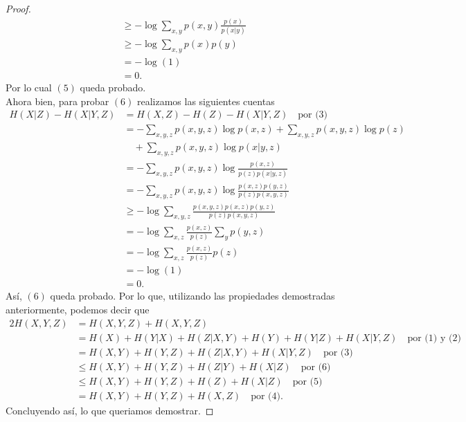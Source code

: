 \begin{enumerate}
\begin{proof}
\begin{align*}
&\geq -\log \sum_{x,y} p(x,y) \frac{p(x)}{p(x|y)} \\
&\geq -\log \sum_{x,y} p(x)p(y) \\
&= -\log(1)\\
&= 0.
\end{align*}
Por lo cual $(5)$ queda probado.\\
Ahora bien, para probar $(6)$ realizamos las siguientes cuentas 
\begin{align*}
H(X|Z) - H(X|Y,Z) 
&= H(X,Z) - H(Z) - H(X|Y,Z) \quad \text{por (3)} \\
&= -\sum_{x,y,z} p(x,y,z) \log p(x,z) + \sum_{x,y,z} p(x,y,z) \log p(z) \\
&\quad + \sum_{x,y,z} p(x,y,z) \log p(x|y,z) \\
&= -\sum_{x,y,z} p(x,y,z) \log \frac{p(x,z)}{p(z)p(x|y,z)} \\
&= -\sum_{x,y,z} p(x,y,z) \log \frac{p(x,z)p(y,z)}{p(z)p(x,y,z)} \\
&\geq -\log \sum_{x,y,z} \frac{p(x,y,z) p(x,z)p(y,z)}{p(z)p(x,y,z)} \\
&= -\log \sum_{x,z} \frac{p(x,z)}{p(z)} \sum_{y} p(y,z) \\
&= -\log \sum_{x,z} \frac{p(x,z)}{p(z)} p(z) \\
&= -\log(1)\\ 
&= 0
.\end{align*}
Así, $(6)$ queda probado. Por lo que, utilizando las propiedades demostradas anteriormente, podemos decir que 
\begin{align*}
    2H(X,Y,Z)&=H(X,Y,Z)+H(X,Y,Z)\\
    &=H(X)+H(Y|X)+H(Z|X,Y)+H(Y)+H(Y|Z)+H(X|Y,Z) \quad \text{por (1) y (2)}\\
    &=H(X,Y)+H(Y,Z)+H(Z|X,Y)+H(X|Y,Z) \quad \text{por (3)}\\
    &\leq H(X,Y)+H(Y,Z)+H(Z|Y)+H(X|Z) \quad \text{por (6)}\\
    &\leq H(X,Y)+H(Y,Z)+H(Z)+H(X|Z) \quad \text{por (5)}\\
    &= H(X,Y)+H(Y,Z)+H(X,Z) \quad \text{por (4)}
.\end{align*}
Concluyendo así, lo que queriamos demostrar.

\end{proof}


\end{enumerate}
